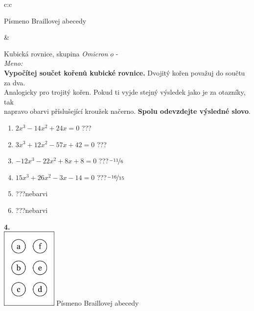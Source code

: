 \documentclass[10pt]{report}
\newcommand\omicron{o}
\begin{document}
\begin{tabular}{c:c}
\begin{minipage}[c][99mm][t]{0.49\linewidth}
\begin{center}
\begin{minipage}{0.20\linewidth}
\begin{center}
{\small Písmeno Braillovej abecedy}
\end{center}
\end{minipage}
\end{center}
\end{minipage}
&
\begin{minipage}[c][99mm][t]{0.49\linewidth}
\begin{center}
\vspace{7mm}
{\huge Kubická rovnice, skupina \textit{Omicron $\omicron$} -}\\[4.5mm]
\textit{Meno:}\phantom{xxxxxxxxxxxxxxxxxxxxxxxxxxxxxxxxxxxxxxxxxxxxxxxxxxxxxxxxxxxxxxxxx}\\[3.5mm]
\textbf{Vypočítej součet kořenů kubické rovnice.} Dvojitý kořen považuj do součtu za dva.\\Analogicky pro trojitý kořen. Pokud ti vyjde stejný výsledek jako je za otazníky, tak\\napravo obarvi příslušející kroužek načerno. \textbf{Spolu odevzdejte výsledné slovo}.\\[3mm]
\begin{minipage}{0.77\linewidth}
\begin{center}
\begin{varwidth}{\textwidth}
\begin{enumerate}
\large
\item $2x^3-14x^2+24x=0$\quad \dotfill\; ???\;\dotfill {}
\item $3x^3+12x^2-57x+42=0$\quad \dotfill\; ???\;\dotfill {}
\item $-12x^3-22x^2+8x+8=0$\quad \dotfill\; ???\;\dotfill \quad $\nicefrac{-11}{6}$
\item $15x^3+26x^2-3x-14=0$\quad \dotfill\; ???\;\dotfill \quad $\nicefrac{-16}{15}$
\item \quad \dotfill\; ???\;\dotfill \quad nebarvi
\item \quad \dotfill\; ???\;\dotfill \quad nebarvi
\end{enumerate}
\end{varwidth}
\end{center}
\end{minipage}
\begin{minipage}{0.20\linewidth}
\begin{center}
{\Huge\bfseries 4.} \\[2mm]
\includegraphics[height=40mm]{../images/braille.png}
{\small Písmeno Braillovej abecedy}
\end{center}
\end{minipage}
\end{center}
\end{minipage}

\end{tabular}
\end{document}
